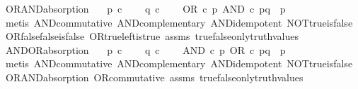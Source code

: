 \begin{isabellebody}
\endisatagproof
{\isafoldproof}%
%
\isadelimproof
\isanewline
%
\endisadelimproof
\isanewline
{}\isamarkupfalse%
\ OR{\isacharunderscore}{\kern0pt}AND{\isacharunderscore}{\kern0pt}absorption{\isacharcolon}{\kern0pt}\isanewline
\ \ \ {\isachardoublequoteopen}p\ {\isasymin}\isactrlsub c\ {\isasymOmega}{\isachardoublequoteclose}\isanewline
\ \ \ {\isachardoublequoteopen}q\ {\isasymin}\isactrlsub c\ {\isasymOmega}{\isachardoublequoteclose}\isanewline
\ \ \ {\isachardoublequoteopen}OR\ {\isasymcirc}\isactrlsub c\ {\isasymlangle}p{\isacharcomma}{\kern0pt}\ AND\ {\isasymcirc}\isactrlsub c\ {\isasymlangle}p{\isacharcomma}{\kern0pt}q{\isasymrangle}{\isasymrangle}\ {\isacharequal}{\kern0pt}\ p{\isachardoublequoteclose}\isanewline
%
\isadelimproof
\ \ %
\endisadelimproof
%
\isatagproof
{}\isamarkupfalse%
\ {\isacharparenleft}{\kern0pt}metis\ AND{\isacharunderscore}{\kern0pt}commutative\ AND{\isacharunderscore}{\kern0pt}complementary\ AND{\isacharunderscore}{\kern0pt}idempotent\ NOT{\isacharunderscore}{\kern0pt}true{\isacharunderscore}{\kern0pt}is{\isacharunderscore}{\kern0pt}false\ OR{\isacharunderscore}{\kern0pt}false{\isacharunderscore}{\kern0pt}false{\isacharunderscore}{\kern0pt}is{\isacharunderscore}{\kern0pt}false\ OR{\isacharunderscore}{\kern0pt}true{\isacharunderscore}{\kern0pt}left{\isacharunderscore}{\kern0pt}is{\isacharunderscore}{\kern0pt}true\ assms\ true{\isacharunderscore}{\kern0pt}false{\isacharunderscore}{\kern0pt}only{\isacharunderscore}{\kern0pt}truth{\isacharunderscore}{\kern0pt}values{\isacharparenright}{\kern0pt}%
\endisatagproof
{\isafoldproof}%
%
\isadelimproof
\isanewline
%
\endisadelimproof
\isanewline
{}\isamarkupfalse%
\ AND{\isacharunderscore}{\kern0pt}OR{\isacharunderscore}{\kern0pt}absorption{\isacharcolon}{\kern0pt}\isanewline
\ \ \ {\isachardoublequoteopen}p\ {\isasymin}\isactrlsub c\ {\isasymOmega}{\isachardoublequoteclose}\isanewline
\ \ \ {\isachardoublequoteopen}q\ {\isasymin}\isactrlsub c\ {\isasymOmega}{\isachardoublequoteclose}\isanewline
\ \ \ {\isachardoublequoteopen}AND\ {\isasymcirc}\isactrlsub c\ {\isasymlangle}p{\isacharcomma}{\kern0pt}\ OR\ {\isasymcirc}\isactrlsub c\ {\isasymlangle}p{\isacharcomma}{\kern0pt}q{\isasymrangle}{\isasymrangle}\ {\isacharequal}{\kern0pt}\ p{\isachardoublequoteclose}\isanewline
%
\isadelimproof
\ \ %
\endisadelimproof
%
\isatagproof
{}\isamarkupfalse%
\ {\isacharparenleft}{\kern0pt}metis\ AND{\isacharunderscore}{\kern0pt}commutative\ AND{\isacharunderscore}{\kern0pt}complementary\ AND{\isacharunderscore}{\kern0pt}idempotent\ NOT{\isacharunderscore}{\kern0pt}true{\isacharunderscore}{\kern0pt}is{\isacharunderscore}{\kern0pt}false\ OR{\isacharunderscore}{\kern0pt}AND{\isacharunderscore}{\kern0pt}absorption\ OR{\isacharunderscore}{\kern0pt}commutative\ assms\ true{\isacharunderscore}{\kern0pt}false{\isacharunderscore}{\kern0pt}only{\isacharunderscore}{\kern0pt}truth{\isacharunderscore}{\kern0pt}values{\isacharparenright}{\kern0pt}%

\end{isabellebody}
